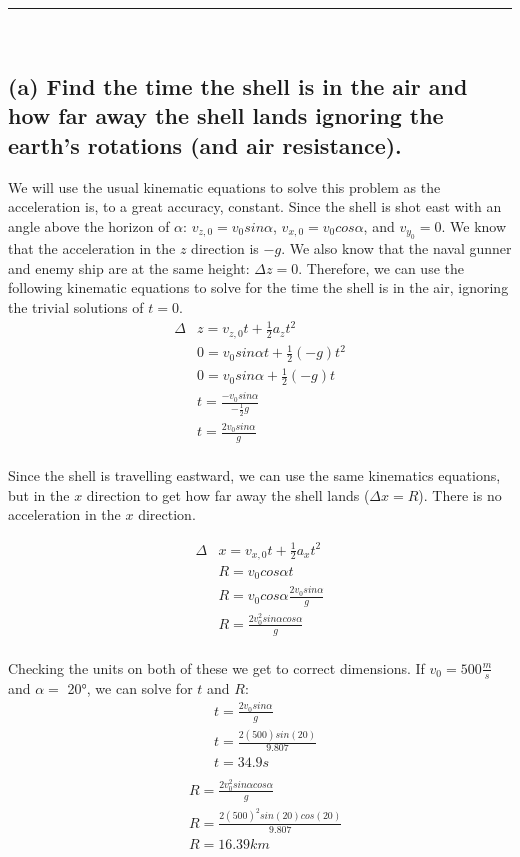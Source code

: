 \documentclass{article}
\begin{document}
\hrule
         \ \ \ 
\subsection*{(a) Find the time the shell is in the air and how far away the shell lands ignoring the earth's rotations (and air resistance).}

We will use the usual kinematic equations to solve this problem as the acceleration is, to a great accuracy, constant. Since the shell is shot east with an angle above the horizon of $\alpha$: $v_{z,0} = v_0sin\alpha$, $v_{x,0} = v_0cos\alpha$, and $v_{y_0} = 0$. We know that the acceleration in the $z$ direction is $-g$. We also know that the naval gunner and enemy ship are at the same height: $\Delta z = 0$. Therefore, we can use the following kinematic equations to solve for the time the shell is in the air, ignoring the trivial solutions of $t=0$.
\begin{align*}
    \Delta &z = v_{z,0}t + \frac{1}{2}a_z t^2 \\
    &0 = v_0sin\alpha t + \frac{1}{2} (-g) t^2 \\
    &0 = v_0sin\alpha + \frac{1}{2} (-g) t \\
    &t = \frac{-v_0 sin\alpha }{-\frac{1}{2}g} \\
    &\boxed{t = \frac{2 v_0 sin\alpha }{g}} \\
\end{align*}

Since the shell is travelling eastward, we can use the same kinematics equations, but in the $x$ direction to get how far away the shell lands ($\Delta x = R$). There is no acceleration in the $x$ direction.  

\begin{align*}
    \Delta &x = v_{x,0}t + \frac{1}{2}a_x t^2 \\
    &R = v_0cos\alpha t  \\
    &R = v_0cos\alpha \frac{2 v_0 sin\alpha }{g}  \\
    &\boxed{R = \frac{2 v_0^2 sin\alpha cos\alpha}{g}}  \\
\end{align*}

Checking the units on both of these we get to correct dimensions. If $v_0= 500 \frac{m}{s}$ and $\alpha =$ 20°, we can solve for $t$ and $R$:
\begin{align*}
    &t = \frac{2 v_0 sin\alpha }{g} \\
    &t = \frac{2 (500) sin(20) }{9.807} \\
    &\boxed{t = 34.9 s} \\
\end{align*}
\begin{align*}
    &R = \frac{2 v_0^2 sin\alpha cos\alpha}{g}\\
    &R = \frac{2 (500)^2 sin(20) cos(20)}{9.807} \\
    &\boxed{R = 16.39  km}
\end{align*}
\end{document}
